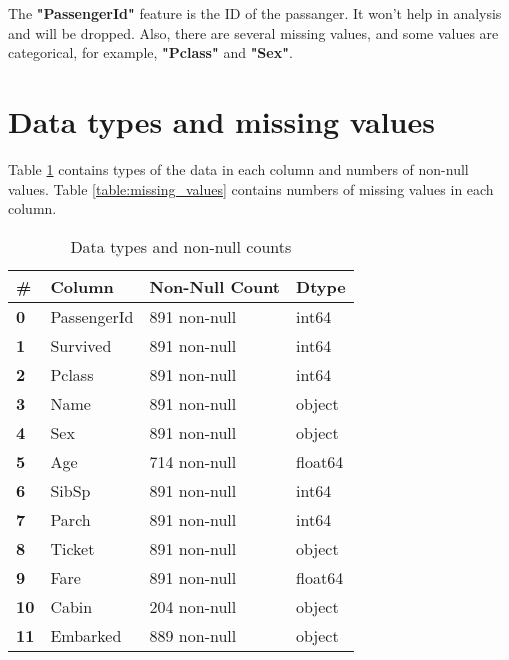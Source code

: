 The \textbf{"PassengerId"} feature is the ID of the passanger. It won't 
help in analysis and will be dropped. Also, there are several missing 
values, and some values are categorical, for example, \textbf{"Pclass"}
and \textbf{"Sex"}.


\section{Data types and missing values}
Table \ref{table:dtypes} contains types of the data in each column and
numbers of non-null values. Table \ref{table:missing_values} contains 
numbers of missing values in each column.

\begin{table}[!ht]
	\centering
	\caption{Data types and non-null counts}
	\begin{tabular}{|l|l|l|l|}
		\hline
		\textbf{\#} & \textbf{Column} & \textbf{Non-Null Count} & \textbf{Dtype} \\ \hline
		\textbf{0}  & PassengerId     & 891 non-null            & int64          \\ \hline
		\textbf{1}  & Survived        & 891 non-null            & int64          \\ \hline
		\textbf{2}  & Pclass          & 891 non-null            & int64          \\ \hline
		\textbf{3}  & Name            & 891 non-null            & object         \\ \hline
		\textbf{4}  & Sex             & 891 non-null            & object         \\ \hline
		\textbf{5}  & Age             & 714 non-null            & float64        \\ \hline
		\textbf{6}  & SibSp           & 891 non-null            & int64          \\ \hline
		\textbf{7}  & Parch           & 891 non-null            & int64          \\ \hline
		\textbf{8}  & Ticket          & 891 non-null            & object         \\ \hline
		\textbf{9}  & Fare            & 891 non-null            & float64        \\ \hline
		\textbf{10} & Cabin           & 204 non-null            & object         \\ \hline
		\textbf{11} & Embarked        & 889 non-null            & object         \\ \hline
	\end{tabular}
	\label{table:dtypes}
\end{table}

